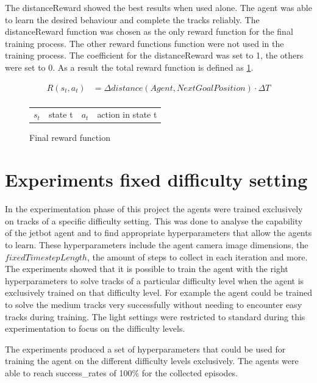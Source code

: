 The distanceReward showed the best results when used alone. The agent was able to learn the desired behaviour and complete the tracks reliably. The distanceReward function was chosen as the only reward function for the final training process. The other reward functions function were not used in the training process.
The coefficient for the distanceReward was set to 1, the others were set to 0. As a result the total reward function is defined as \ref{fig:final_reward_function}.

\begin{figure}
    \centering
    \begin{align*}
        R(s_t,a_t) & = \Delta distance(Agent, NextGoalPosition) \cdot \Delta T \nonumber \\
    \end{align*}
    \caption{Final reward function}
    \begin{tabular}{r@{: }l r@{: }l}
        $s_t$ & state t & $a_t$ & action in state t
    \end{tabular}
    \label{fig:final_reward_function}
\end{figure}


\section{Experiments fixed difficulty setting}
\label{cha:experiment_fixed_difficulty}

In the experimentation phase of this project the agents were trained exclusively on tracks of a specific difficulty setting. This was done to analyse the capability of the jetbot agent and to find appropriate hyperparameters that allow the agents to learn. These hyperparameters include the agent camera image dimensions, the $fixedTimestepLength$, the amount of steps to collect in each iteration and more.
The experiments showed that it is possible to train the agent with the right hyperparameters to solve tracks of a particular difficulty level when the agent is exclusively trained on that difficulty level. For example the agent could be trained to solve the medium tracks very successfully without needing to encounter easy tracks during training. The light settings were restricted to standard during this experimentation to focus on the difficulty levels.

The experiments produced a set of hyperparameters that could be used for training the agent on the different difficulty levels exclusively. The agents were able to reach success\_rates of 100\% for the collected episodes.

